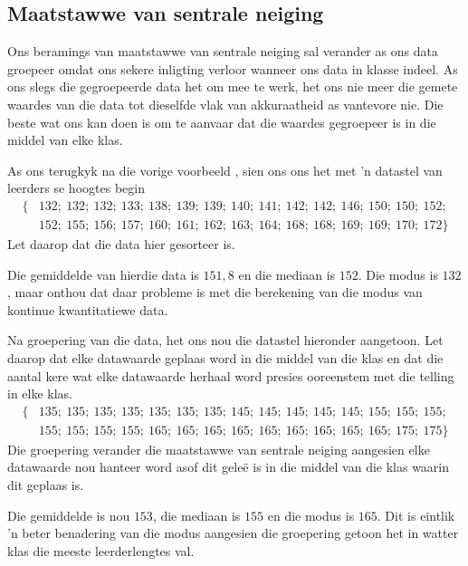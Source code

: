 \subsection*{Maatstawwe van sentrale neiging}
Ons beramings van maatstawwe van sentrale neiging sal verander as ons data groepeer omdat ons sekere inligting verloor wanneer ons data in klasse indeel. As ons slegs die gegroepeerde data het om mee te werk, het ons nie meer die gemete waardes van die data tot dieselfde vlak van akkuraatheid as vantevore nie. Die beste wat ons kan doen is om te aanvaar dat die waardes gegroepeer is in die middel van elke klas.\par

As ons terugkyk na die vorige voorbeeld , sien ons ons het met ’n datastel van leerders se hoogtes begin
\begin{align*}
  \{&132;\ 132;\ 132;\ 133;\ 138;\ 139;\ 139;\ 140;\ 141;\ 142;\ 142;\ 146;\ 150;\ 150;\ 152;\\
    &152;\ 155;\ 156;\ 157;\ 160;\ 161;\ 162;\ 163;\ 164;\ 168;\ 168;\ 169;\ 169;\ 170;\ 172\}
\end{align*}
Let daarop dat die data hier gesorteer is.

Die gemiddelde van hierdie data is $151,8$ en die mediaan is $152$. Die modus is $132$, maar onthou dat daar probleme is met die berekening van die modus van kontinue kwantitatiewe data. \par

Na groepering van die data, het ons nou die datastel hieronder aangetoon. Let daarop dat elke datawaarde geplaas word in die middel van die klas en dat die aantal kere wat elke datawaarde herhaal word presies ooreenstem met die telling in elke klas. 
\begin{align*}
  \{&135;\ 135;\ 135;\ 135;\ 135;\ 135;\ 135;\ 145;\ 145;\ 145;\ 145;\ 145;\ 155;\ 155;\ 155;\\
    &155;\ 155;\ 155;\ 155;\ 165;\ 165;\ 165;\ 165;\ 165;\ 165;\ 165;\ 165;\ 165;\ 175;\ 175\}
\end{align*}
Die groepering verander die maatstawwe van sentrale neiging aangesien elke datawaarde nou hanteer word asof dit geleë is in die middel van die klas waarin dit geplaas is. \par
\clearpage
Die gemiddelde is nou $153$, die mediaan is $155$ en die modus is $165$. Dit is eintlik ’n beter benadering van die modus aangesien die groepering getoon het in watter klas die meeste leerderlengtes val. 


